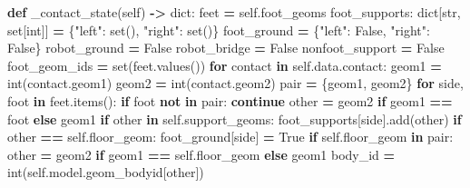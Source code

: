 \documentclass[
  american,
  11pt,
  letterpaper,
]{article}
\newenvironment{Shaded}{\begin{snugshade}}{\end{snugshade}}
\newcommand{\BuiltInTok}[1]{#1}
\newcommand{\ControlFlowTok}[1]{\textcolor[rgb]{0.13,0.29,0.53}{\textbf{#1}}}
\newcommand{\KeywordTok}[1]{\textcolor[rgb]{0.13,0.29,0.53}{\textbf{#1}}}
\newcommand{\NormalTok}[1]{#1}
\newcommand{\OperatorTok}[1]{\textcolor[rgb]{0.81,0.36,0.00}{\textbf{#1}}}
\newcommand{\StringTok}[1]{\textcolor[rgb]{0.31,0.60,0.02}{#1}}
\newcommand{\VariableTok}[1]{\textcolor[rgb]{0.00,0.00,0.00}{#1}}
\renewenvironment{Shaded}{\par\smallskip}{\par\smallskip}
\begin{document}
\begin{Shaded}
\begin{Highlighting}[]
    \KeywordTok{def}\NormalTok{ \_contact\_state(}\VariableTok{self}\NormalTok{) }\OperatorTok{{-}\textgreater{}} \BuiltInTok{dict}\NormalTok{:}
\NormalTok{        feet }\OperatorTok{=} \VariableTok{self}\NormalTok{.foot\_geoms}
\NormalTok{        foot\_supports: }\BuiltInTok{dict}\NormalTok{[}\BuiltInTok{str}\NormalTok{, }\BuiltInTok{set}\NormalTok{[}\BuiltInTok{int}\NormalTok{]] }\OperatorTok{=}\NormalTok{ \{}\StringTok{"left"}\NormalTok{: }\BuiltInTok{set}\NormalTok{(), }\StringTok{"right"}\NormalTok{: }\BuiltInTok{set}\NormalTok{()\}}
\NormalTok{        foot\_ground }\OperatorTok{=}\NormalTok{ \{}\StringTok{"left"}\NormalTok{: }\VariableTok{False}\NormalTok{, }\StringTok{"right"}\NormalTok{: }\VariableTok{False}\NormalTok{\}}
\NormalTok{        robot\_ground }\OperatorTok{=} \VariableTok{False}
\NormalTok{        robot\_bridge }\OperatorTok{=} \VariableTok{False}
\NormalTok{        nonfoot\_support }\OperatorTok{=} \VariableTok{False}
\NormalTok{        foot\_geom\_ids }\OperatorTok{=} \BuiltInTok{set}\NormalTok{(feet.values())}
        \ControlFlowTok{for}\NormalTok{ contact }\KeywordTok{in} \VariableTok{self}\NormalTok{.data.contact:}
\NormalTok{            geom1 }\OperatorTok{=} \BuiltInTok{int}\NormalTok{(contact.geom1)}
\NormalTok{            geom2 }\OperatorTok{=} \BuiltInTok{int}\NormalTok{(contact.geom2)}
\NormalTok{            pair }\OperatorTok{=}\NormalTok{ \{geom1, geom2\}}
            \ControlFlowTok{for}\NormalTok{ side, foot }\KeywordTok{in}\NormalTok{ feet.items():}
                \ControlFlowTok{if}\NormalTok{ foot }\KeywordTok{not} \KeywordTok{in}\NormalTok{ pair:}
                    \ControlFlowTok{continue}
\NormalTok{                other }\OperatorTok{=}\NormalTok{ geom2 }\ControlFlowTok{if}\NormalTok{ geom1 }\OperatorTok{==}\NormalTok{ foot }\ControlFlowTok{else}\NormalTok{ geom1}
                \ControlFlowTok{if}\NormalTok{ other }\KeywordTok{in} \VariableTok{self}\NormalTok{.support\_geoms:}
\NormalTok{                    foot\_supports[side].add(other)}
                \ControlFlowTok{if}\NormalTok{ other }\OperatorTok{==} \VariableTok{self}\NormalTok{.floor\_geom:}
\NormalTok{                    foot\_ground[side] }\OperatorTok{=} \VariableTok{True}
            \ControlFlowTok{if} \VariableTok{self}\NormalTok{.floor\_geom }\KeywordTok{in}\NormalTok{ pair:}
\NormalTok{                other }\OperatorTok{=}\NormalTok{ geom2 }\ControlFlowTok{if}\NormalTok{ geom1 }\OperatorTok{==} \VariableTok{self}\NormalTok{.floor\_geom }\ControlFlowTok{else}\NormalTok{ geom1}
\NormalTok{                body\_id }\OperatorTok{=} \BuiltInTok{int}\NormalTok{(}\VariableTok{self}\NormalTok{.model.geom\_bodyid[other])}

\end{Highlighting}
\end{Shaded}
\end{document}
